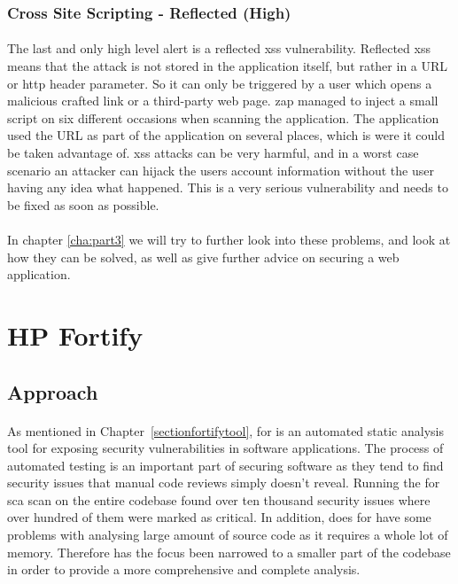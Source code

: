 \documentclass[11pt,english,a4paper]{report}
\begin{document}
\subsubsection{Cross Site Scripting - Reflected (High)}
\paragraph{}
The last and only high level alert is a reflected \gls{xss} vulnerability. 
Reflected \gls{xss} means that the attack is not stored in the application itself, but rather in a URL or \gls{http} header parameter.
So it can only be triggered by a user which opens a malicious crafted link or a third-party web page.
\gls{zap} managed to inject a small script on six different occasions when scanning the application.
The application used the URL as part of the application on several places, which is were it could be taken advantage of.
\gls{xss} attacks can be very harmful, and in a worst case scenario an attacker can hijack the users account information without the user having any idea what happened.
This is a very serious vulnerability and needs to be fixed as soon as possible.

\paragraph{}
In chapter \ref{cha:part3} we will try to further look into these problems, and look at how they can be solved, as well as give further advice on securing a web application.



\section{HP Fortify}
\subsection{Approach}
\paragraph{}
As mentioned in Chapter~\ref{sectionfortifytool}, \gls{for} is an automated static analysis tool for exposing security vulnerabilities in software applications. 
The process of automated testing is an important part of securing software as they tend to find security issues that manual code reviews simply doesn't reveal.
Running the \gls{for} \gls{sca} scan on the entire codebase found over ten thousand security issues where over hundred of them were marked as critical.
In addition, does \gls{for} have some problems with analysing large amount of source code as it requires a whole lot of memory.
Therefore has the focus been narrowed to a smaller part of the codebase in order to provide a more comprehensive and complete analysis.
\end{document}
